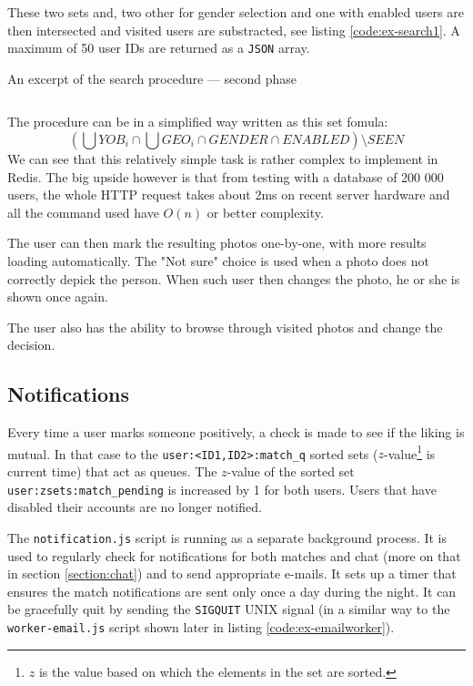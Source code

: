 \documentclass[12pt,oneside]{fithesis}
\begin{document}
		These two sets and, two other for gender selection and one with enabled users are then intersected and visited users are substracted, see listing \ref{code:ex-search1}. A maximum of 50 user IDs are returned as a \texttt{JSON} array.
		
		\begin{program}[h]
		\caption{An excerpt of the search procedure --- second phase}
		\label{code:ex-search1}
		\inputminted[fontsize=\footnotesize, linenos=false]{javascript}{ex-search1.js}
		\end{program}
	
		The procedure can be in a simplified way written as this set fomula:
		\[
			\left( \bigcup YOB_i \cap \bigcup GEO_i \cap GENDER \cap ENABLED \right) \setminus SEEN
		\]
		We can see that this relatively simple task is rather complex to implement in Redis. The big upside however is that from testing with a database of 200 000 users, the whole HTTP request takes about 2ms on recent server hardware and all the command used have $O(n)$ or better complexity.
	
		The user can then mark the resulting photos one-by-one, with more results loading automatically. The "Not sure" choice is used when a photo does not correctly depick the person. When such user then changes the photo, he or she is shown once again. 
		
		The user also has the ability to browse through visited photos and change the decision.
		\clearpage
	\subsection{Notifications}
		Every time a user marks someone positively, a check is made to see if the liking is mutual. In that case to the \texttt{user:<ID1,ID2>:match\_q} sorted sets ($z$-value\footnote{$z$ is the value based on which the elements in the set are sorted.} is current time) that act as queues. The $z$-value of the sorted set \texttt{user:zsets:match\_pending} is increased by 1 for both users. Users that have disabled their accounts are no longer notified.
		
		The \texttt{notification.js} script is running as a separate background process. It is used to regularly check for notifications for both matches and chat (more on that in section \ref{section:chat}) and to send appropriate e-mails. It sets up a timer that ensures the match notifications are sent only once a day during the night. It can be gracefully quit by sending the \texttt{SIGQUIT} UNIX signal (in a similar way to the \texttt{worker-email.js} script shown later in listing \ref{code:ex-emailworker}).
		
\end{document}
